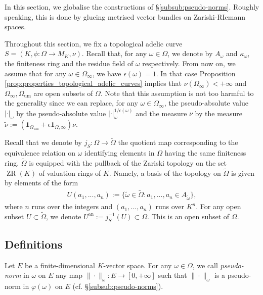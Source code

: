 \documentclass [11pt,reqno]{amsart}
\newcommand{\1}{\mathmybb{1}}
\def\an{\operatorname{an}}
\def\um{\operatorname{um}}
\def\ZR{\operatorname{ZR}}
\def\tilde{\widetilde}
\newcommand{\va}{|\cdot|}
\begin{document}
In this section, we globalise the constructions of \S \ref{subsub:pseudo-norms}. Roughly speaking, this is done by glueing metrised vector bundles on Zariski-RIemann spaces. 

Throughout this section, we fix a topological adelic curve $S=(K,\phi: \Omega \to M_K, \nu)$. Recall that, for any $\omega\in\Omega$, we denote by $A_{\omega}$ and $\kappa_{\omega}$, the finiteness ring and the residue field of $\omega$ respectively. From now on, we assume that for any $\omega\in\Omega_{\infty}$, we have $\epsilon(\omega)=1$. In that case Proposition \ref{prop:properties_topological_adelic_curves} implies that $\nu(\Omega_{\infty}) <+\infty$ and $\Omega_{\infty},\Omega_{\um}$ are open subsets of $\Omega$. Note that this assumption is not too harmful to the generality since we can replace, for any $\omega\in\Omega_{\infty}$, the pseudo-absolute value $\va_{\omega}$ by the pseudo-absolute value $\va_{\omega}^{1/\epsilon(\omega)}$ and the measure $\nu$ by the measure $\tilde{\nu}:=(\mathbf{1}_{\Omega_{\um}}+\epsilon\mathbf{1}_{\Omega,\infty})\nu$. 

Recall that we denote by $j_{S}: \Omega\to\tilde{\Omega}$ the quotient map corresponding to the equivalence relation on $\omega$ identifying elements in $\Omega$ having the same finiteness ring. $\tilde{\Omega}$ is equipped with the pullback of the Zariski topology on the set $\ZR(K)$ of valuation rings of $K$. Namely, a basis of the topology on $\tilde{\Omega}$ is given by elements of the form
\begin{align*}
U(a_{1},...,a_{n}) := \{\tilde{\omega}\in\tilde{\Omega}: a_{1},...,a_{n}\in A_{\tilde{\omega}}\},
\end{align*}
where $n$ runs over the integers and $(a_{1},...,a_{n})$ runs over $K^{n}$. For any open subset $U\subset\tilde{\Omega}$, we denote $U^{\an}:=j_{S}^{-1}(U) \subset \Omega$. This is an open subset of $\Omega$.

\subsection{Definitions}

Let $E$ be a finite-dimensional $K$-vector space. For any $\omega\in\Omega$,  we call \emph{pseudo-norm} in $\omega$ on $E$ any map $\|\cdot\|_\omega : E \to [0,+\infty]$ such that $\|\cdot\|_{\omega}$ is a pseudo-norm in $\varphi(\omega)$ on $E$ (cf. \S \ref{subsub:pseudo-norms}).
\end{document}
